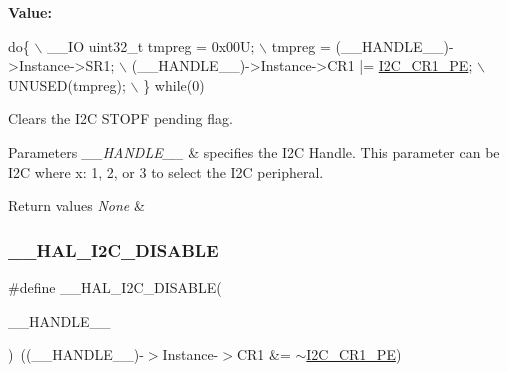 {\bfseries Value\+:}
\begin{DoxyCode}
\textcolor{keywordflow}{do}\{                                           \(\backslash\)
    \_\_IO uint32\_t tmpreg = 0x00U;               \(\backslash\)
    tmpreg = (\_\_HANDLE\_\_)->Instance->SR1;       \(\backslash\)
    (\_\_HANDLE\_\_)->Instance->CR1 |= \mbox{\hyperlink{group___peripheral___registers___bits___definition_ga953b0d38414808db79da116842ed3262}{I2C\_CR1\_PE}};  \(\backslash\)
    UNUSED(tmpreg);                             \(\backslash\)
  \} \textcolor{keywordflow}{while}(0)
\end{DoxyCode}


Clears the I2C S\+T\+O\+PF pending flag. 


\begin{DoxyParams}{Parameters}
{\em \+\_\+\+\_\+\+H\+A\+N\+D\+L\+E\+\_\+\+\_\+} & specifies the I2C Handle. This parameter can be I2C where x\+: 1, 2, or 3 to select the I2C peripheral. \\
\hline
\end{DoxyParams}

\begin{DoxyRetVals}{Return values}
{\em None} & \\
\hline
\end{DoxyRetVals}
\mbox{\label{group___i2_c___exported___macros_ga3d6a35da02ca72537a15570912c80412}} 
\subsubsection{\texorpdfstring{\+\_\+\+\_\+\+H\+A\+L\+\_\+\+I2\+C\+\_\+\+D\+I\+S\+A\+B\+LE}{\_\_HAL\_I2C\_DISABLE}}
{\footnotesize\ttfamily \#define \+\_\+\+\_\+\+H\+A\+L\+\_\+\+I2\+C\+\_\+\+D\+I\+S\+A\+B\+LE(\begin{DoxyParamCaption}\item[{}]{\+\_\+\+\_\+\+H\+A\+N\+D\+L\+E\+\_\+\+\_\+ }\end{DoxyParamCaption})~((\+\_\+\+\_\+\+H\+A\+N\+D\+L\+E\+\_\+\+\_\+)-\/$>$Instance-\/$>$C\+R1 \&=  $\sim$\mbox{\hyperlink{group___peripheral___registers___bits___definition_ga953b0d38414808db79da116842ed3262}{I2\+C\+\_\+\+C\+R1\+\_\+\+PE}})}



